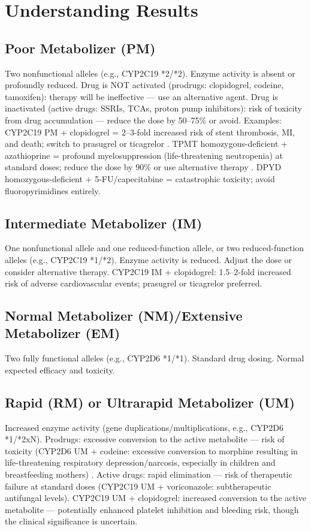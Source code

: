 \section*{Understanding Results}

\subsection*{Poor Metabolizer (PM)}
Two nonfunctional alleles (e.g., CYP2C19 *2/*2). Enzyme activity is absent or profoundly reduced. Drug is NOT activated (prodrugs: clopidogrel, codeine, tamoxifen): therapy will be ineffective --- use an alternative agent. Drug is inactivated (active drugs: SSRIs, TCAs, proton pump inhibitors): risk of toxicity from drug accumulation --- reduce the dose by 50--75\% or avoid. Examples: CYP2C19 PM + clopidogrel = 2--3-fold increased risk of stent thrombosis, MI, and death; switch to prasugrel or ticagrelor \cite{scott2013cyp2c19}. TPMT homozygous-deficient + azathioprine = profound myelosuppression (life-threatening neutropenia) at standard doses; reduce the dose by 90\% or use alternative therapy \cite{relling2019thiopurine}. DPYD homozygous-deficient + 5-FU/capecitabine = catastrophic toxicity; avoid fluoropyrimidines entirely.

\subsection*{Intermediate Metabolizer (IM)}
One nonfunctional allele and one reduced-function allele, or two reduced-function alleles (e.g., CYP2C19 *1/*2). Enzyme activity is reduced. Adjust the dose or consider alternative therapy. CYP2C19 IM + clopidogrel: 1.5--2-fold increased risk of adverse cardiovascular events; prasugrel or ticagrelor preferred.

\subsection*{Normal Metabolizer (NM)/Extensive Metabolizer (EM)}
Two fully functional alleles (e.g., CYP2D6 *1/*1). Standard drug dosing. Normal expected efficacy and toxicity.

\subsection*{Rapid (RM) or Ultrarapid Metabolizer (UM)}
Increased enzyme activity (gene duplications/multiplications, e.g., CYP2D6 *1/*2xN). Prodrugs: excessive conversion to the active metabolite --- risk of toxicity (CYP2D6 UM + codeine: excessive conversion to morphine resulting in life-threatening respiratory depression/narcosis, especially in children and breastfeeding mothers) \cite{crews2014cyp2d6}. Active drugs: rapid elimination --- risk of therapeutic failure at standard doses (CYP2C19 UM + voriconazole: subtherapeutic antifungal levels). CYP2C19 UM + clopidogrel: increased conversion to the active metabolite --- potentially enhanced platelet inhibition and bleeding risk, though the clinical significance is uncertain.

